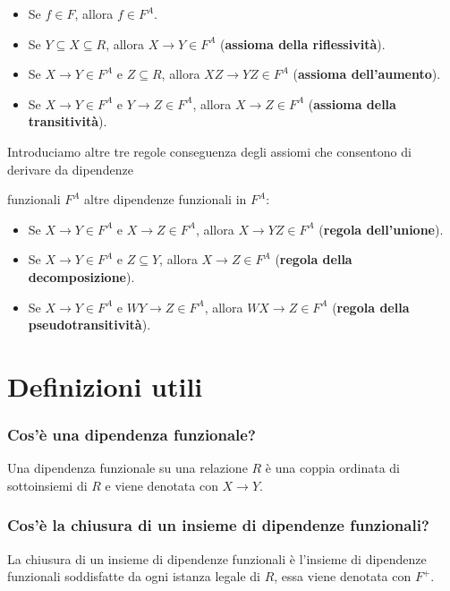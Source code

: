 \documentclass{article}
\begin{document}
\begin{itemize}
  \item Se $f\in F$, allora $f\in F^A$.
  \item Se $Y\subseteq X\subseteq R$, allora $X\to Y\in F^A$ (\textbf{assioma della riflessività}).
  \item Se $X\to Y\in F^A$ e $Z\subseteq R$, allora $XZ\to YZ\in F^A$ (\textbf{assioma dell'aumento}).
  \item Se $X\to Y\in F^A$ e $Y\to Z\in F^A$, allora $X\to Z\in F^A$ (\textbf{assioma della transitività}).
\end{itemize}

Introduciamo altre tre regole conseguenza degli assiomi che consentono di derivare da dipendenze \par funzionali $F^A$ altre dipendenze funzionali in $F^A$:

\begin{itemize}
  \item Se $X\to Y\in F^A$ e $X\to Z\in F^A$, allora $X \to YZ\in F^A$ (\textbf{regola dell'unione}).
  \item Se $X\to Y\in F^A$ e $Z\subseteq Y$, allora $X \to Z\in F^A$ (\textbf{regola della decomposizione}).
  \item Se $X\to Y\in F^A$ e $WY\to Z\in F^A$, allora $WX\to Z\in F^A$ (\textbf{regola della pseudotransitività}).
\end{itemize}





\pagebreak


\section{Definizioni utili}
\subsubsection{Cos'è una dipendenza funzionale?}
Una dipendenza funzionale su una relazione $R$ è una coppia ordinata di sottoinsiemi di $R$ e viene denotata con $X \rightarrow Y$.\\

\subsubsection{Cos'è la chiusura di un insieme di dipendenze funzionali?}
La chiusura di un insieme di dipendenze funzionali è l'insieme di dipendenze funzionali soddisfatte da ogni istanza legale di $R$, essa viene denotata con $F^+$.\\
\end{document}
